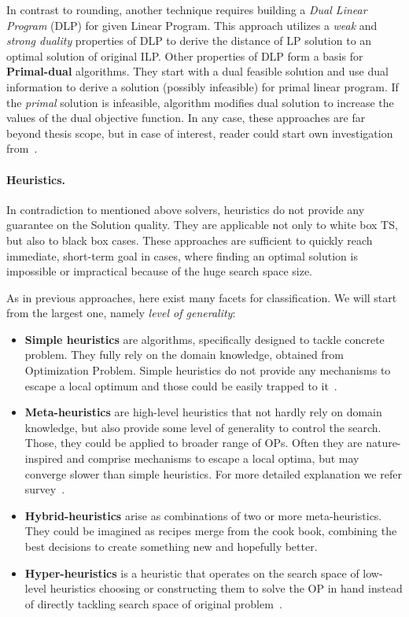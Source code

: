 In contrast to rounding, another technique requires building a \textit{Dual Linear Program} (DLP) for given Linear Program. This approach utilizes a \textit{weak} and \textit{strong duality} properties of DLP to derive the distance of LP solution to an optimal solution of original ILP. Other properties of DLP form a basis for \textbf{Primal-dual} algorithms. They start with a dual feasible solution and use dual information to derive a solution (possibly infeasible) for primal linear program. If the \textit{primal} solution is infeasible, algorithm modifies dual solution to increase the values of the dual objective function. In any case, these approaches are far beyond thesis scope, but in case of interest, reader could start own investigation from~\cite{williamson2011design}. 


\paragraph{Heuristics.} In contradiction to mentioned above solvers, heuristics do not provide any guarantee on the Solution quality. They are applicable not only to white box TS, but also to black box cases. These approaches are sufficient to quickly reach immediate, short-term goal in cases, where finding an optimal solution is impossible or impractical because of the huge search space size.

As in previous approaches, here exist many facets for classification.
We will start from the largest one, namely \textit{level of generality}:
\begin{itemize}[itemsep=8pt]
	\item \textbf{Simple heuristics} are algorithms, specifically designed to tackle concrete problem. They fully rely on the domain knowledge, obtained from Optimization Problem. Simple heuristics do not provide any mechanisms to escape a local optimum and those could be easily trapped to it~\cite{pearl1984intelligent}.
	
	\item \textbf{Meta-heuristics} are high-level heuristics that not hardly rely on domain knowledge, but also provide some level of generality to control the search. Those, they could be applied to broader range of OPs. Often they are nature-inspired and comprise mechanisms to escape a local optima, but may converge slower than simple heuristics. For more detailed explanation we refer survey~\cite{bianchi2009survey}.
	
	\item \textbf{Hybrid-heuristics} arise as combinations of two or more meta-heuristics. They could be imagined as recipes merge from the cook book, combining the best decisions to create something new and hopefully better.
	
	\item \textbf{Hyper-heuristics} is a heuristic that operates on the search space of low-level heuristics choosing or constructing them to solve the OP in hand instead of directly tackling search space of original problem~\cite{burke2003hyper}. 
\end{itemize}

